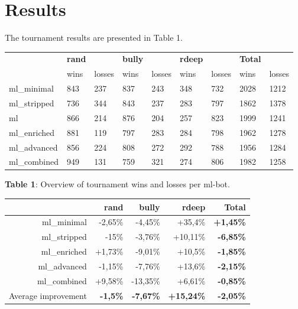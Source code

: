 \documentclass[a4paper,11pt]{article}
\begin{document}
\section{Results}
The tournament results are presented in Table 1. 

\setlength{\leftmargin}{0pt}
\begin{center}
  \begin{tabular}{ | l | l l | l l | l l | |l l | }
     \hline
      & \textbf{rand} & & \textbf{bully} & & \textbf{rdeep} & & \textbf{Total} & \\
      & wins & losses & wins & losses & wins & losses  & wins & losses \\ \hline
      ml\_minimal & 843 & 237 & 837 & 243 & 348 & 732 & 2028 & 1212 \\ \hline
      ml\_stripped & 736 & 344 & 843 & 237 & 283 & 797 & 1862 & 1378 \\ \hline
      ml & 866 & 214 & 876 & 204 & 257 & 823 & 1999 & 1241 \\ \hline 
      ml\_enriched & 881 & 119 & 797 & 283 & 284 & 798 & 1962 & 1278 \\ \hline
      ml\_advanced  & 856 & 224 & 808 & 272 & 292 & 788 & 1956 & 1284 \\ \hline
      ml\_combined & 949 & 131 & 759 & 321 & 274 & 806  & 1982 & 1258\\ \hline
  \end{tabular}
\end{center}
\textbf{Table 1}: Overview of tournament wins and losses per ml-bot. \\

\begin{center}
\begin{tabular}{| r | r | r | r || r |}
\hline
      & \textbf{rand} & \textbf{bully} & \textbf{rdeep} & \textbf{Total} \\ \hline
      ml\_minimal & -2,65\% & -4,45\% & +35,4\% & \textbf{+1,45\%}   \\ \hline
      ml\_stripped & -15\% & -3,76\% & +10,11\% & \textbf{-6,85\%}  \\ \hline
      ml\_enriched & +1,73\% & -9,01\% & +10,5\% & \textbf{-1,85\%} \\ \hline
      ml\_advanced & -1,15\% & -7,76\% & +13,6\%& \textbf{-2,15\%}  \\ \hline
      ml\_combined & +9,58\% & -13,35\% & +6,61\% & \textbf{-0,85\%}  \\ \hline \hline
      Average improvement & \textbf{-1,5\%} & \textbf{-7,67\%} & \textbf{+15,24\%} &\textbf{-2,05\%} \\ \hline
\end{tabular} \\
\end{center}
\end{document}
